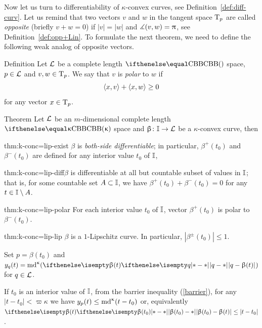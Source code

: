 \medskip

Now let us turn to differentiability of $\kappa$-convex curves, see Definition~\ref{def:diff-curv}.
Let us remind that two vectors $v$ and $w$ in the tangent space $\text{\rm T}_p$ are called \emph{opposite} (briefly $v+w=0$)
if $|v|=|w|$ and $\measuredangle(v,w)=\uppi$, see Definition~\ref{def:opp+Lin}.
To formulate the next theorem, we need to define the following weak analog of opposite vectors. 

\begin{thm}{Definition}\label{def:polar}
Let $\mathcal{L}$ be a complete length $\Alex{}$ space, 
$p\in \spc{L}$ 
and $v,w\in \T_p$.
We say that $v$ is \emph{polar} to $w$ if 
\[\<x,v\>+\<x,w\>\ge0\] 
for any vector $x\in\T_p$.
\end{thm}

\begin{thm}{Theorem}\label{thm:k-conc=lip} 
Let $\mathcal{L}$  be an $m$-dimensional complete length $\Alex\kappa$ space
and $\beta\:\II\to \spc{L}$ be a $\kappa$-convex curve,
then 

\begin{subthm}{thm:k-conc=lip-exist} $\beta$ is \emph{both-side differentiable}; in particular, $\beta^+(t_0)$ and $\beta^-(t_0)$ are defined for any interior value $t_0$ of $\mathbb{I}$, 
\end{subthm}

\begin{subthm}{thm:k-conc=lip-diff}$\beta$ is differentiable at all but countable subset of values in $\mathbb{I}$; that is, for some countable set $A\subset \II$, we have $\beta^+(t_0)+\beta^-(t_0)=0$ 
for any $t\in \II\setminus A$.
\end{subthm}


\begin{subthm}{thm:k-conc=lip-polar} For each interior value $t_0$ of $\mathbb{I}$,
vector $\beta^+(t_0)$ is polar to $\beta^-(t_0)$. 
\end{subthm}

\begin{subthm}{thm:k-conc=lip-lip} $\beta$ is a $1$-Lipschitz curve.
\subitem In particular, $|\beta^\pm(t_0)|\le 1$.
\end{subthm}
\end{thm}

Set $p=\beta(t_0)$ and $y_q(t)=\md\kappa(\dist{q}{\beta(t)}{})$ for $q\in \spc{L}$.

 If $t_0$ is an interior value of $\mathbb{I}$,
from the barrier inequality (\ref{barrier}), for any $|t-t_0|<\varpi\kappa$ we have 
$y_p(t)\le \md\kappa(t-t_0)$ or, equivalently $\dist{\beta(t_0)}{\beta(t)}{}\le |t-t_0|$.

